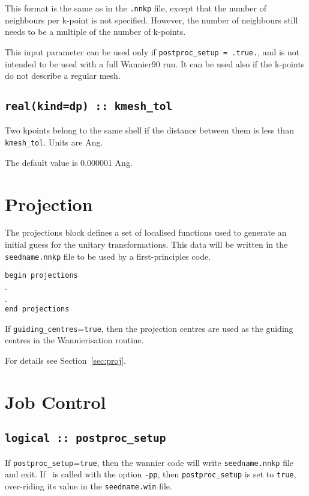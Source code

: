 This format is the same as in the \texttt{.nnkp} file, except that the number of neighbours per k-point is not specified. However, the number of neighbours still needs to be a multiple of the number of k-points.

This input parameter can be used only if \texttt{postproc\_setup = .true.}, and is not intended to be used with a full Wannier90 run. It can be used also if the k-points do not describe a regular mesh.

\subsection[kmesh\_tol]{\tt real(kind=dp) :: kmesh\_tol}

Two kpoints belong to the same shell if the distance between them is
less than {\tt kmesh\_tol}.
Units are Ang.

The default value is 0.000001 Ang.

\section{Projection}

 The projections block defines a set of localised functions used to
 generate an initial guess for the unitary transformations. 
This data will be written in the {\tt seedname.nnkp} file to be used
by a first-principles code.

\noindent \verb#begin projections# \\ 
  . \\ 
  . \\ 
\verb#end projections#

If \verb#guiding_centres#={\tt true}, then the projection centres are
used as the guiding centres in the Wannierisation routine.

For details see Section~\ref{sec:proj}.

\section{Job Control}

\subsection[postproc\_setup]{\tt logical :: postproc\_setup}
If \verb#postproc_setup#=\verb#true#, then the wannier code will write 
 {\tt seedname.nnkp} file and exit.
If \wannier\ is called with the option {\tt -pp}, then 
 \verb#postproc_setup# is set to 
\verb#true#, over-riding its
value in the {\tt seedname.win} file.

